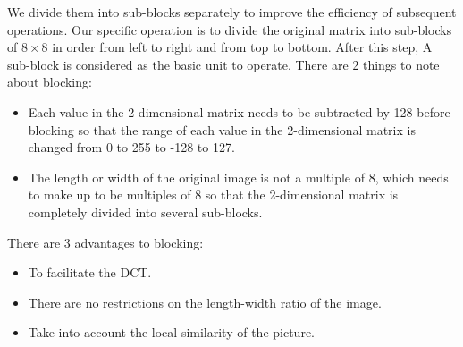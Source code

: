 \documentclass{mcmthesis}
\begin{document}
We divide them into sub-blocks separately to improve the efficiency of subsequent operations. Our specific operation is to divide the original matrix into sub-blocks of $8\times8$ in order from left to right and from top to bottom. After this step, A sub-block is considered as the basic unit to operate.
There are 2 things to note about blocking:
\begin{itemize}
\item Each value in the 2-dimensional matrix needs to be subtracted by 128 before blocking so that the range of each value in the 2-dimensional matrix is changed from 0 to 255 to -128 to 127.
\item The length or width of the original image is not a multiple of 8, which needs to make up to be multiples of 8 so that the 2-dimensional matrix is completely divided into several sub-blocks.
\end{itemize}
There are 3 advantages to blocking:
\begin{itemize}
  \item To facilitate the DCT.
  \item There are no restrictions on the length-width ratio of the image.
  \item Take into account the local similarity of the picture.  
\end{itemize}
\end{document}
